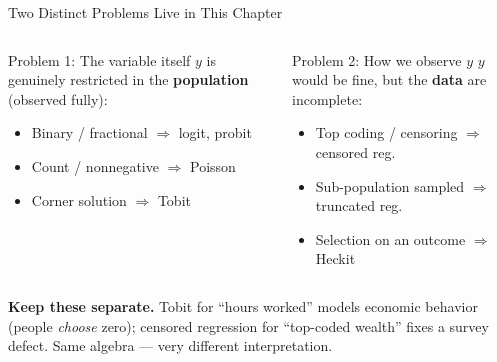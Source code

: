 \documentclass[aspectratio=169, 12pt]{beamer}
\begin{document}
\begin{frame}[shrink=8]{Two Distinct Problems Live in This Chapter}

  \begin{columns}[t]
    \begin{definitionbox}{Problem 1: The variable itself}
      $y$ is genuinely restricted in the \textbf{population} (observed fully):
      \begin{itemize}
        \item Binary / fractional $\Rightarrow$ logit, probit
        \item Count / nonnegative $\Rightarrow$ Poisson
        \item Corner solution $\Rightarrow$ Tobit
      \end{itemize}
    \end{definitionbox}

    \begin{definitionbox}{Problem 2: How we observe $y$}
      $y$ would be fine, but the \textbf{data} are incomplete:
      \begin{itemize}
        \item Top coding / censoring $\Rightarrow$ censored reg.
        \item Sub-population sampled $\Rightarrow$ truncated reg.
        \item Selection on an outcome $\Rightarrow$ Heckit
      \end{itemize}
    \end{definitionbox}
  \end{columns}

  \smallskip

  \begin{keybox}
    \small
    \textbf{Keep these separate.} Tobit for ``hours worked'' models economic
    behavior (people \emph{choose} zero); censored regression for ``top-coded
    wealth'' fixes a survey defect. Same algebra --- very different interpretation.
  \end{keybox}

\end{frame}
\end{document}

